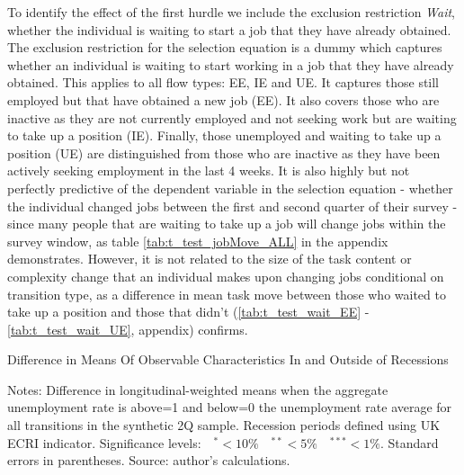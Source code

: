 \documentclass[12pt,authoryear]{elsarticle}
\begin{document}
To identify the effect of the first hurdle we include the exclusion restriction \textit{Wait}, whether the individual is waiting to start a job that they have already obtained. The exclusion restriction for the selection equation is a dummy which captures whether an individual is waiting to start working in a job that they have already obtained. This applies to all flow types: EE, IE and UE. It captures those still employed but that have obtained a new job (EE). It also covers those who are inactive as they are not currently employed and not seeking work but are waiting to take up a position (IE). Finally, those unemployed and waiting to take up a position (UE) are distinguished from those who are inactive as they have been actively seeking employment in the last 4 weeks. It is also highly but not perfectly predictive of the dependent variable in the selection equation - whether the individual changed jobs between the first and second quarter of their survey - since many people that are waiting to take up a job will change jobs within the survey window, as table \ref{tab:t_test_jobMove_ALL} in the appendix demonstrates. However, it is not related to the size of the task content or complexity change that an individual makes upon changing jobs conditional on transition type, as a difference in mean task move between those who waited to take up a position and those that didn't (\ref{tab:t_test_wait_EE} - \ref{tab:t_test_wait_UE}, appendix) confirms.


	\newpage
\thispagestyle{empty}
\begin{table}[H]
	\centering
	\caption{Difference in Means Of Observable Characteristics In and Outside of Recessions}\label{tab:diffMeans}
	\begin{adjustbox}{max width=16cm, max height=10cm}
		\begin{threeparttable}
			
			\begin{tablenotes}
				\item \footnotesize{Notes: Difference in longitudinal-weighted means when the aggregate unemployment rate is above=1 and below=0 the unemployment rate average for all transitions in the synthetic 2Q sample. Recession periods defined using UK ECRI indicator. Significance levels:$ \quad ^{*}<10\% \quad ^{**}<5\% \quad ^{***}<1\%$. Standard errors in parentheses. Source: author's calculations.}  
			\end{tablenotes}
		\end{threeparttable}
	\end{adjustbox}
\end{table}
\end{document}
